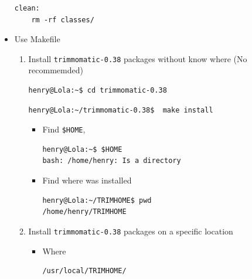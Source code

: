\documentclass{article}
\begin{document}
\begin{itemize}
\begin{verbatim}
clean:
	rm -rf classes/
\end{verbatim}
\normalsize
\item Use Makefile
\begin{enumerate}
\item Install \verb+trimmomatic-0.38+ packages without know where (No recommemded)
\scriptsize 
\begin{verbatim}
henry@Lola:~$ cd trimmomatic-0.38
\end{verbatim}
\normalsize
\scriptsize 
\begin{verbatim}
henry@Lola:~/trimmomatic-0.38$  make install
\end{verbatim}
\normalsize
\begin{itemize}
 \item Find \verb+$HOME+, 
\scriptsize 
\begin{verbatim}
henry@Lola:~$ $HOME
bash: /home/henry: Is a directory
\end{verbatim}
\normalsize
\item Find where was installed
\scriptsize 
\begin{verbatim}
henry@Lola:~/TRIMHOME$ pwd
/home/henry/TRIMHOME
\end{verbatim}
\normalsize
\end{itemize}
\item Install \verb+trimmomatic-0.38+ packages on a specific location
\begin{itemize}
\item Where 
\scriptsize 
\begin{verbatim}
/usr/local/TRIMHOME/

\end{verbatim}
\end{itemize}
\end{enumerate}
\end{itemize}
\end{document}
